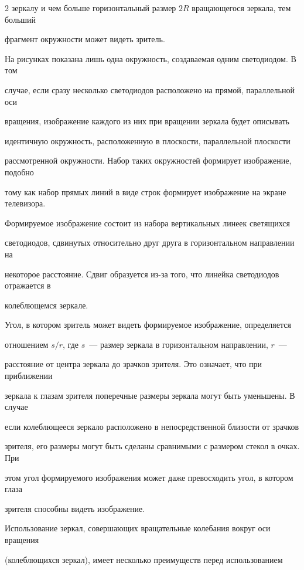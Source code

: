 \begin{multicols}{2}
зеркалу и чем больше горизонтальный размер $2R$ вращающегося зеркала, тем больший 

фрагмент окружности может видеть зритель. 

  

  На рисунках показана лишь одна окружность, создаваемая одним светодиодом. В том 

случае, если сразу несколько светодиодов расположено на прямой, параллельной оси 

вращения, изображение каждого из них при вращении зеркала будет описывать 

идентичную окружность, расположенную в плоскости, параллельной плоскости 

рас\-смот\-рен\-ной окружности. Набор таких окружностей формирует изображение, подобно 

тому как набор прямых линий в виде строк формирует изображение на экране телевизора. 

Формируемое изображение состоит из набора вертикальных линеек светящихся 

светодиодов, сдвинутых относительно друг друга в горизонтальном направлении на 

некоторое расстояние. Сдвиг образуется из-за того, что линейка светодиодов отражается в 

колеблющемся зеркале.

  

  Угол, в котором зритель может видеть формируемое изображение, определяется 

отношением $s/r$, где $s$~--- размер зеркала в горизонтальном направлении, $r$~--- 

расстояние от центра зеркала до зрачков зрителя. Это означает, что при приближении 

зеркала к глазам зрителя поперечные размеры зеркала могут быть уменьшены. В случае 

если колеблющееся зеркало расположено в непосредственной близости от зрачков 

зрителя, его размеры могут быть сделаны сравнимыми с размером стекол в очках. При 

этом угол формируемого изображения может даже превосходить угол, в котором глаза 

зрителя способны видеть изображение. 

  

  Использование зеркал, совершающих вращательные колебания вокруг оси вращения 

(ко\-леб\-лю\-щих\-ся зеркал), имеет несколько преимуществ перед использованием 


\end{multicols}
